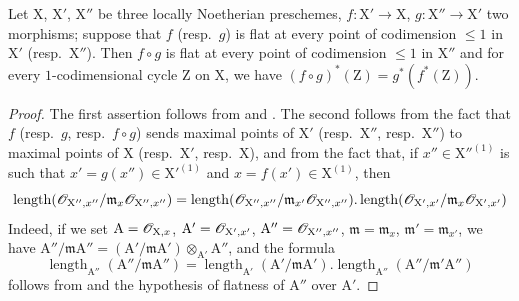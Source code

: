 \begin{proposition}[21.10.8]
\label{IV.21.10.8}
Let $\mathrm{X}$, $\mathrm{X}'$, $\mathrm{X}''$ be three locally Noetherian preschemes, $f:\mathrm{X}'\to\mathrm{X}$, $g:\mathrm{X}''\to\mathrm{X}'$ two morphisms; suppose that $f$ \textup{(resp.\ $g$)} is flat at every point of codimension $\leq 1$ in $\mathrm{X}'$ \textup{(resp.\ $\mathrm{X}''$)}.
Then $f\circ g$ is flat at every point of codimension $\leq 1$ in $\mathrm{X}''$ and for every $1$-codimensional cycle $\mathrm{Z}$ on $\mathrm{X}$, we have $(f\circ g)^*(\mathrm{Z})=g^*(f^*(\mathrm{Z}))$.
\end{proposition}

\begin{proof}
The first assertion follows from  and .
The second follows from the fact that $f$ (resp.\ $g$, resp.\ $f\circ g$) sends maximal points of $\mathrm{X}'$ (resp.\ $\mathrm{X}''$, resp.\ $\mathrm{X}''$) to maximal points of $\mathrm{X}$ (resp.\ $\mathrm{X}'$, resp.\ $\mathrm{X}$), and from the fact that, if $x''\in\mathrm{X}''^{(1)}$ is such that $x'=g(x'')\in\mathrm{X}'^{(1)}$ and $x=f(x')\in\mathrm{X}^{(1)}$, then
\[
  \operatorname{length}(\mathscr{O}_{\mathrm{X}'',x''}/\mathfrak{m}_x\mathscr{O}_{\mathrm{X}'',x''})=\operatorname{length}(\mathscr{O}_{\mathrm{X}'',x''}/\mathfrak{m}_{x'}\mathscr{O}_{\mathrm{X}'',x''}).\operatorname{length}(\mathscr{O}_{\mathrm{X}',x'}/\mathfrak{m}_x\mathscr{O}_{\mathrm{X}',x'})
\]
Indeed, if we set $\mathrm{A}=\mathscr{O}_{\mathrm{X},x}$, $\mathrm{A}'=\mathscr{O}_{\mathrm{X}',x'}$, $\mathrm{A}''=\mathscr{O}_{\mathrm{X}'',x''}$, $\mathfrak{m}=\mathfrak{m}_x$, $\mathfrak{m}'=\mathfrak{m}_{x'}$, we have $\mathrm{A}''/\mathfrak{m}\mathrm{A}''=(\mathrm{A}'/\mathfrak{m}\mathrm{A}')\otimes_{\mathrm{A}'}\mathrm{A}''$, and the formula
\[
  \operatorname{length}_{\mathrm{A}''}(\mathrm{A}''/\mathfrak{m}\mathrm{A}'')=\operatorname{length}_{\mathrm{A}'}(\mathrm{A}'/\mathfrak{m}\mathrm{A}').\operatorname{length}_{\mathrm{A}''}(\mathrm{A}''/\mathfrak{m}'\mathrm{A}'')
\]
follows from  and the hypothesis of flatness of $\mathrm{A}''$ over $\mathrm{A}'$.
\end{proof}


